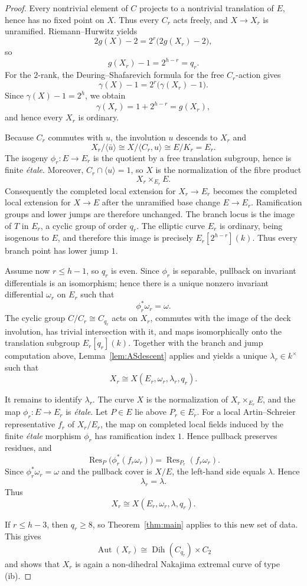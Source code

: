 \documentclass[10pt,a4paper]{amsart}
\newcommand{\Aut}{\operatorname{Aut}}
\newcommand{\Dih}{\operatorname{Dih}}
\newcommand{\Res}{\operatorname{Res}}
\begin{document}
\begin{proof}
Every nontrivial element of $C$ projects to a nontrivial translation of
$E$, hence has no fixed point on $X$.  Thus every $C_r$ acts freely, and
$X\to X_r$ is unramified.  Riemann--Hurwitz yields
\[
 2g(X)-2=2^r\bigl(2g(X_r)-2\bigr),
\]
so
\[
 g(X_r)-1=2^{h-r}=q_r.
\]
For the $2$-rank, the Deuring--Shafarevich formula for the free
$C_r$-action gives
\[
 \gamma(X)-1=2^r\bigl(\gamma(X_r)-1\bigr).
\]
Since $\gamma(X)-1=2^h$, we obtain
\[
 \gamma(X_r)=1+2^{h-r}=g(X_r),
\]
and hence every $X_r$ is ordinary.

Because $C_r$ commutes with $u$, the involution $u$ descends to $X_r$ and
\[
 X_r/\langle\bar u\rangle
 \cong X/\langle C_r,u\rangle
 \cong E/K_r=E_r.
\]
The isogeny $\phi_r:E\to E_r$ is the quotient by a free translation
subgroup, hence is finite \emph{\'etale}.  Moreover,
$C_r\cap\langle u\rangle=1$, so $X$ is the normalization of the fibre
product
\[
 X_r\times_{E_r}E.
\]
Consequently the completed local extension for $X_r\to E_r$ becomes the
completed local extension for $X\to E$ after the unramified base change
$E\to E_r$.  Ramification groups and lower jumps are therefore unchanged.
The branch locus is the image of $T$ in $E_r$, a cyclic group of order
$q_r$.  The elliptic curve $E_r$ is ordinary, being isogenous to $E$, and
therefore this image is precisely $E_r[2^{h-r}](k)$.  Thus every branch
point has lower jump $1$.

Assume now $r\le h-1$, so $q_r$ is even.  Since $\phi_r$ is separable,
pullback on invariant differentials is an isomorphism; hence there is a
unique nonzero invariant differential $\omega_r$ on $E_r$ such that
\[
        \phi_r^*\omega_r=\omega.
\]
The cyclic group $C/C_r\cong C_{q_r}$ acts on $X_r$, commutes with the
image of the deck involution, has trivial intersection with it, and maps
isomorphically onto the translation subgroup $E_r[q_r](k)$.  Together
with the branch and jump computation above, Lemma~\ref{lem:ASdescent} applies and yields a unique $\lambda_r\in k^\times$ such that
\[
        X_r\cong X(E_r,\omega_r,\lambda_r,q_r).
\]

It remains to identify $\lambda_r$.  The curve $X$ is the normalization of
$X_r\times_{E_r}E$, and the map $\phi_r:E\to E_r$ is \emph{\'etale}.
Let $P\in E$ lie above $P_r\in E_r$.  For a local Artin--Schreier
representative $f_r$ of $X_r/E_r$, the map on completed local fields
induced by the finite \emph{\'etale} morphism $\phi_r$ has ramification
index $1$.  Hence pullback preserves residues, and
\[
 \Res_P\bigl(\phi_r^*(f_r\omega_r)\bigr)
   =\Res_{P_r}(f_r\omega_r).
\]  Since
$\phi_r^*\omega_r=\omega$ and the pullback cover is $X/E$, the left-hand
side equals $\lambda$.  Hence
\[
        \lambda_r=\lambda.
\]
Thus
\[
        X_r\cong X(E_r,\omega_r,\lambda,q_r).
\]

If $r\le h-3$, then $q_r\ge8$, so Theorem~\ref{thm:main} applies to this
new set of data.  This gives
\[
 \Aut(X_r)\cong\Dih(C_{q_r})\times C_2
\]
and shows that $X_r$ is again a non-dihedral Nakajima extremal curve of
type \textup{(ib)}.
\end{proof}
\end{document}
